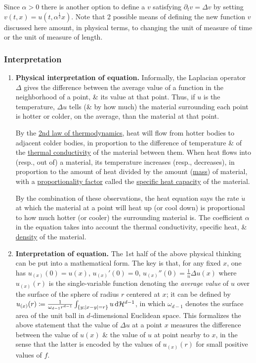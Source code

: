 \documentclass{article}
\begin{document}
Since $\alpha > 0$ there is another option to define a $v$ satisfying $\partial_tv = \Delta v$ by setting $v(t,x) = u(t,\alpha^{\frac{1}{2}}x)$. Note that 2 possible means of defining the new function $v$ discussed here amount, in physical terms, to changing the unit of measure of time or the unit of measure of length.

\subsubsection{Interpretation}

\begin{enumerate}
	\item {\bf Physical interpretation of equation.} Informally, the Laplacian operator $\Delta$ gives the difference between the average value of a function in the neighborhood of a point, \& its value at that point. Thus, if $u$ is the temperature, $\Delta u$ tells (\& by how much) the material surrounding each point is hotter or colder, on the average, than the material at that point.
	
	By the \href{https://en.wikipedia.org/wiki/Second_law_of_thermodynamics}{2nd law of thermodynamics}, heat will flow from hotter bodies to adjacent colder bodies, in proportion to the difference of temperature \& of the \href{https://en.wikipedia.org/wiki/Thermal_conductivity}{thermal conductivity} of the material between them. When heat flows into (resp., out of) a material, its temperature increases (resp., decreases), in proportion to the amount of heat divided by the amount (\href{https://en.wikipedia.org/wiki/Mass}{mass}) of material, with a \href{https://en.wikipedia.org/wiki/Proportionality_(mathematics)}{proportionality factor} called the \href{https://en.wikipedia.org/wiki/Specific_heat_capacity}{specific heat capacity} of the material.
	
	By the combination of these observations, the heat equation says the rate $\dot{u}$ at which the material at a point will heat up (or cool down) is proportional to how much hotter (or cooler) the surrounding material is. The coefficient $\alpha$ in the equation takes into account the thermal conductivity, specific heat, \& \href{https://en.wikipedia.org/wiki/Density}{density} of the material.
	\item {\bf Interpretation of equation.} The 1st half of the above physical thinking can be put into a mathematical form. The key is that, for any fixed $x$, one has $u_{(x)}(0) = u(x)$, $u_{(x)}'(0) = 0$, $u_{(x)}''(0) = \frac{1}{n}\Delta u(x)$ where $u_{(x)}(r)$ is the single-variable function denoting the {\it average value} of $u$ over the surface of the sphere of radius $r$ centered at $x$; it can be defined by $u_{(x)}(r)\coloneqq\frac{1}{\omega_{d - 1}r^{d - 1}}\int_{\{y;|x - y| = r\}} u\,{\rm d}\mathcal{H}^{d - 1}$, in which $\omega_{d - 1}$ denotes the surface area of the unit ball in $d$-dimensional Euclidean space. This formalizes the above statement that the value of $\Delta u$ at a point $x$ measures the difference between the value of $u(x)$ \& the value of $u$ at point nearby to $x$, in the sense that the latter is encoded by the values of $u_{(x)}(r)$ for small positive values of $f$.
	

\end{enumerate}
\end{document}
